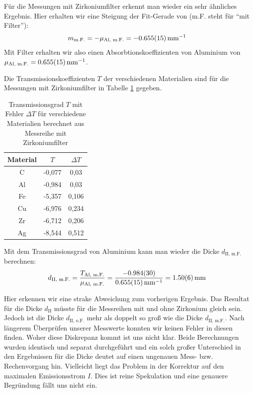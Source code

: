\documentclass{article}
\begin{document}
Für die Messungen mit Zirkoniumfilter erkennt man wieder ein sehr ähnliches Ergebnis.
Hier erhalten wir eine Steigung der Fit-Gerade von (m.F. steht für ``mit Filter''):
\begin{displaymath}
    m_\text{m.F.} = - \mu_\text{Al, m.F.} = \SI{- 0,655 \pm 0,015}{\per \milli\meter}
\end{displaymath}
Mit Filter erhalten wir also einen Absorbtionskoeffizienten von Aluminium von $\mu_\text{Al, m.F.} = \SI{0,655 \pm 0,015}{\per \milli\meter}$.

Die Transmissionskoeffizienten $T$ der verschiedenen Materialien sind für die Messungen mit Zirkoniumfilter in Tabelle \ref{tab:Transmissionsgrade2} gegeben.
\begin{table}[H]
    \centering
    \caption{Transmissionsgrad $T$ mit Fehler $\Delta T$ für verschiedene Materialien berechnet aus Messreihe mit Zirkoniumfilter}
    \begin{tabular}{|c|c|c|}
        \hline
        Material & $T$ & $\Delta T$ \\ \hline \hline
         C & -0,077 & 0,03 \\ \hline
         Al & -0,984 & 0,03 \\ \hline
         Fe & -5,357 & 0,106 \\ \hline
         Cu & -6,976 & 0,234 \\ \hline
         Zr & -6,712 & 0,206 \\ \hline
         Ag & -8,544 & 0,512 \\ \hline
    \end{tabular}
    \label{tab:Transmissionsgrade2}
\end{table}

Mit dem Transmissionsgrad von Aluminium kann man wieder die Dicke $d_\text{II, m.F.}$ berechnen:
\begin{displaymath}
    d_\text{II, m.F.} = \frac{T_\text{Al, m.F.}}{\mu_\text{Al, m.F.}} = \frac{\SI{-0,984 \pm 0,030}{}}{\SI{0,655 \pm 0,015}{\per \milli\meter}} = \SI{1,50 \pm 0,06}{\milli\meter}
\end{displaymath}

Hier erkennen wir eine strake Abweichung zum vorherigen Ergebnis.
Das Resultat für die Dicke $d_\text{II}$ müsste für die Messreihen mit und ohne Zirkonium gleich sein.
Jedoch ist die Dicke $d_\text{II, o.F.}$ mehr als doppelt so groß wie die Dicke $d_\text{II, m.F.}$.
Nach längerem Überprüfen unserer Messwerte konnten wir keinen Fehler in diesen finden.
Woher diese Diskrepanz kommt ist uns nicht klar.
Beide Berechnungen wurden identisch und separat durchgeführt und ein solch großer Unterschied in den Ergebnissen für die Dicke deutet auf einen ungenauen Mess- bzw. Rechenvorgang hin.
Vielleicht liegt das Problem in der Korrektur auf den maximalen Emissionsstrom $I$.
Dies ist reine Spekulation und eine genauere Begründung fällt uns nicht ein.
\end{document}
